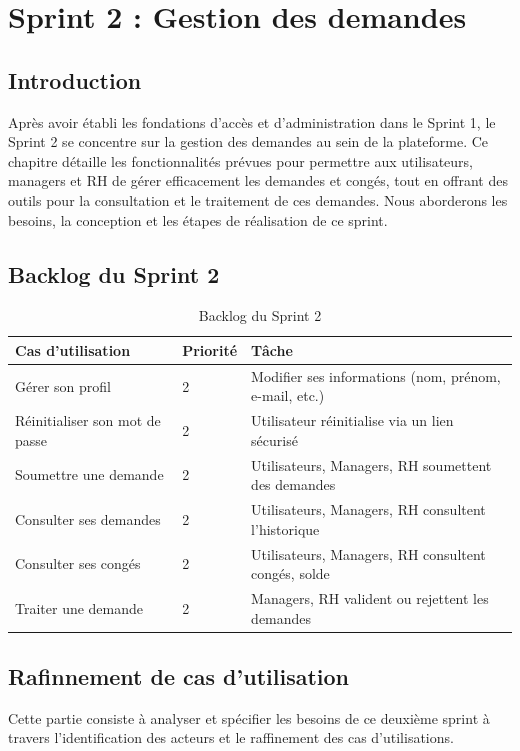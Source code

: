 \chapter{Sprint 2 : Gestion des demandes}
\section{Introduction}
Après avoir établi les fondations d'accès et d'administration dans le Sprint 1, le Sprint 2 se concentre sur la gestion des demandes au sein de la plateforme. Ce chapitre détaille les fonctionnalités prévues pour permettre aux utilisateurs, managers et RH de gérer efficacement les demandes et congés, tout en offrant des outils pour la consultation et le traitement de ces demandes. Nous aborderons les besoins, la conception et les étapes de réalisation de ce sprint.
\section{Backlog du Sprint 2}
\begin{table}[!ht]
\begin{adjustwidth}{-2.5cm}{-2.5cm}
\centering
\caption{Backlog du Sprint 2}
\label{tab:backlog_sprint2}
\begin{tabular}{ | m{5cm} | m{1cm} | m{5.5cm} | }
\hline
\cellcolor[rgb]{0.832,0.832,0.832}Cas d'utilisation & \cellcolor[rgb]{0.832,0.832,0.832}Priorité & \cellcolor[rgb]{0.832,0.832,0.832}Tâche \\
\hline
Gérer son profil & 2 & Modifier ses informations (nom, prénom, e-mail, etc.) \\
\hline
Réinitialiser son mot de passe & 2 & Utilisateur réinitialise via un lien sécurisé \\
\hline
Soumettre une demande & 2 & Utilisateurs, Managers, RH soumettent des demandes \\
\hline
Consulter ses demandes & 2 & Utilisateurs, Managers, RH consultent l’historique \\
\hline
Consulter ses congés & 2 & Utilisateurs, Managers, RH consultent congés, solde \\
\hline
Traiter une demande & 2 & Managers, RH valident ou rejettent les demandes \\
\hline
\end{tabular}
\end{adjustwidth}
\end{table}
\section{Rafinnement de cas d'utilisation }
Cette partie consiste à analyser et spécifier les besoins de ce deuxième sprint à travers l’identification des acteurs et le raffinement des cas d’utilisations.
